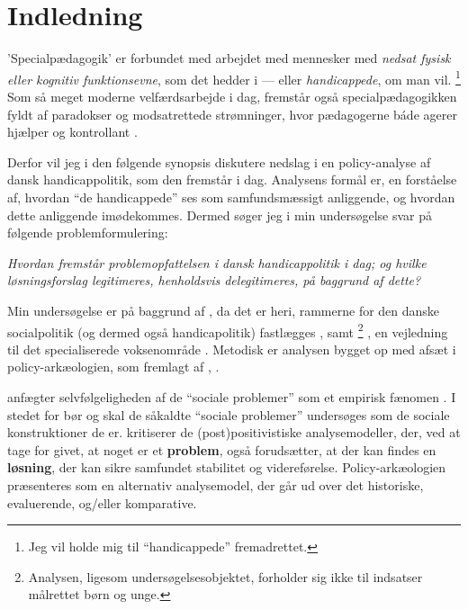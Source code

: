 \section{Indledning}

'Specialpædagogik' er forbundet med arbejdet med mennesker med \textit{nedsat fysisk eller kognitiv funktionsevne}, som det hedder i  — eller \textit{handicappede}, om man vil. \footnote{Jeg vil holde mig til “handicappede” fremadrettet.}
Som så meget moderne velfærdsarbejde i dag, fremstår også specialpædagogikken fyldt af paradokser og modsatrettede strømninger, hvor pædagogerne báde agerer hjælper og kontrollant \autocite{mik-meyerIndledningSkabeProfessionel2012}. 

Derfor vil jeg i den følgende synopsis diskutere nedslag i en policy-analyse af dansk handicappolitik, som den fremstår i dag.
Analysens formål er, en forståelse af, hvordan “de handicappede” ses som samfundsmæssigt anliggende, og hvordan dette anliggende imødekommes.
Dermed søger jeg i min undersøgelse svar på følgende problemformulering:
\begin{center}
  \textit{Hvordan fremstår problemopfattelsen i dansk handicappolitik i dag; og hvilke løsningsforslag legitimeres, henholdsvis delegitimeres, på baggrund af dette?}
\end{center}
Min undersøgelse er på baggrund af , da det er heri, rammerne for den danske socialpolitik (og dermed også handicapolitik) fastlægges \autocite[kapitel 2]{social-ogindenrigsministerietBekendtgorelseAfLov2019}, samt \footnote{Analysen, ligesom undersøgelsesobjektet, forholder sig ikke til indsatser målrettet børn og unge.}
, en vejledning til det specialiserede voksenområde \autocite{klStyringAfDet2017}.
Metodisk er analysen bygget op med afsæt i policy-arkæologien, som fremlagt af \citeauthor{scheurichPolicyArchaeologyNew1994}, \citeyear{scheurichPolicyArchaeologyNew1994}.

\citeauthor{scheurichPolicyArchaeologyNew1994}  anfægter selvfølgeligheden af de “sociale problemer” som et empirisk fænomen \autocite[s. ??]{scheurichPolicyArchaeologyNew1994}.
I stedet for bør og skal de såkaldte “sociale problemer” undersøges som de sociale konstruktioner de er.
\citeauthor{scheurichPolicyArchaeologyNew1994} kritiserer de (post)positivistiske analysemodeller, der, ved at tage for givet, at noget er et \textbf{problem}, også forudsætter, at der kan findes en \textbf{løsning}, der kan sikre samfundet stabilitet og videreførelse.
Policy-arkæologien præsenteres som en alternativ analysemodel, der går ud over det historiske, evaluerende, og/eller komparative.

